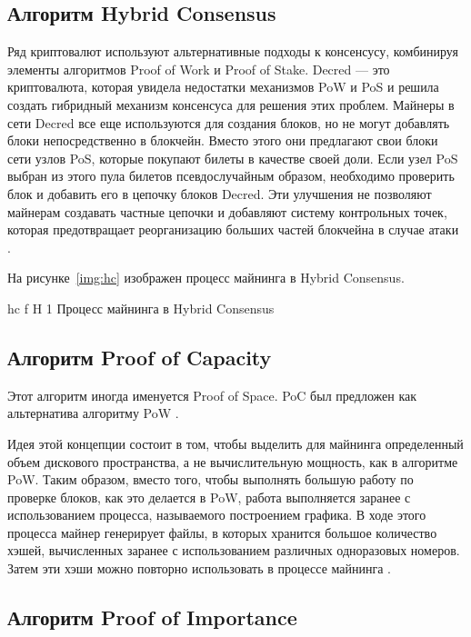 \documentclass{bmstu}
\begin{document}
\subsection{Алгоритм Hybrid Consensus}

Ряд криптовалют используют альтернативные подходы к консенсусу, комбинируя элементы алгоритмов Proof of Work и Proof of Stake. 
Decred --- это криптовалюта, которая увидела недостатки механизмов PoW и PoS и решила создать гибридный механизм консенсуса для решения этих проблем. 
Майнеры в сети Decred все еще используются для создания блоков, но не могут добавлять блоки непосредственно в блокчейн. 
Вместо этого они предлагают свои блоки сети узлов PoS, которые покупают билеты в качестве своей доли. 
Если узел PoS выбран из этого пула билетов псевдослучайным образом, необходимо проверить блок и добавить его в цепочку блоков Decred. 
Эти улучшения не позволяют майнерам создавать частные цепочки и добавляют систему контрольных точек, которая предотвращает реорганизацию больших частей блокчейна в случае атаки \cite{Auhl2022}.

На рисунке~\ref{img:hc} изображен процесс майнинга в Hybrid Consensus.

    {hc}
    {f}
    {H}
    {1\textwidth}
    {Процесс майнинга в Hybrid Consensus \cite{Auhl2022}}

\subsection{Алгоритм Proof of Capacity}

Этот алгоритм иногда именуется Proof of Space. 
PoC был предложен как альтернатива алгоритму PoW \cite{Kolmogorov1982}.

Идея этой концепции состоит в том, чтобы выделить для майнинга определенный объем дискового пространства, а не вычислительную мощность, как в алгоритме PoW. 
Таким образом, вместо того, чтобы выполнять большую работу по проверке блоков, как это делается в PoW, работа выполняется заранее с использованием процесса, называемого построением графика. 
В ходе этого процесса майнер генерирует файлы, в которых хранится большое количество хэшей, вычисленных заранее с использованием различных одноразовых номеров. 
Затем эти хэши можно повторно использовать в процессе майнинга \cite[362]{Azbeg2020}.

\subsection{Алгоритм Proof of Importance}
\end{document}
